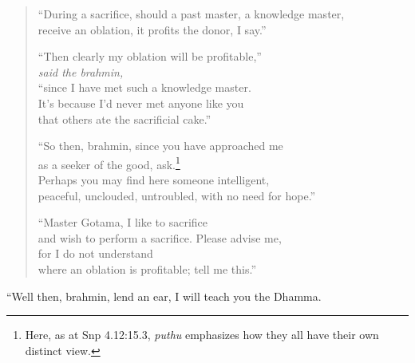 \documentclass[12pt,openany]{book}%
\newcommand*{\scspeaker}[1]{\hspace{2em}\textit{#1}}
\begin{document}
\begin{verse}
“During a sacrifice, should a past master, a knowledge master, \\
receive an oblation, it profits the donor, I say.” 

“Then clearly my oblation will be profitable,” \\
\scspeaker{said the brahmin, }\\
“since I have met such a knowledge master. \\
It’s because I’d never met anyone like you \\
that others ate the sacrificial cake.” 

“So then, brahmin, since you have approached me \\
as a seeker of the good, ask.\footnote{Here, as at Snp 4.12:15.3, \textit{puthu} emphasizes how they all have their own distinct view. } \\
Perhaps you may find here someone intelligent, \\
peaceful, unclouded, untroubled, with no need for hope.” 

“Master Gotama, I like to sacrifice \\
and wish to perform a sacrifice. Please advise me, \\
for I do not understand \\
where an oblation is profitable; tell me this.” 

%
\end{verse}

“Well then, brahmin, lend an ear, I will teach you the Dhamma. 
\end{document}
